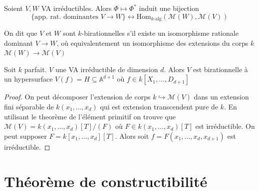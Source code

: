 \begin{lemma}{}
    Soient \(V, W\) VA irréductibles. Alors \(\Phi \mapsto \Phi^{*}\) induit une
    bijection
    \[
      \{\text{app. rat. dominantes \(V \to W\)}\} \leftrightarrow
      \mathrm{Hom}_{k\text{-alg}} {(\mathcal{M}{(W)}, \mathcal{M}{(V)})}
    \]
\end{lemma}

\begin{definition}{}
    On dit que \(V\) et \(W\) sont \(k\)-birationnelles s'il existe un
    isomorphisme rationale dominant \(V \to W\), où equivalentement un
    isomorphisme des extensions du corps \(k\) \(\mathcal{M}{(W)} \to \mathcal{M}{(V)}\) 
\end{definition}


\begin{proposition}{}
    Soit \(k\) parfait. \(V\) une VA irréductible de dimension \(d\). Alors \(V\) est
    birationnelle à un hypersurface \(V{(f)} = H \subseteq \mathbb{A}^{d+1} \)
    où \(f \in  k[X_{1}, \dots, D_{d+1}]\) 
\end{proposition}
\begin{proof}{}
    On peut décomposer l'extension de corps \(k \hookrightarrow
    \mathcal{M}{(V)}\) dans un extension fini séparable de \(k{(x_{1}, \dots,
    x_d)}\) qui est extension transcendent pure de \(k\).
    En utilisant le theorème de l'élément primitif on trouve que
    \(\mathcal{M}{(V)} = k{(x_{1}, \dots, x_d)}[T] / {(F)}\) où \(F \in
    k{(x_{1}, \dots, x_d)}[T]\) est irréductible. On peut supposer \(F =
    k[x_{1},\dots, x_d][T]\). Alors soit \(f = F{(x_{1}, \dots, x_d, x_{d+1}
    )}\) est irréductible.
\end{proof}

\section{Théorème de constructibilité}

